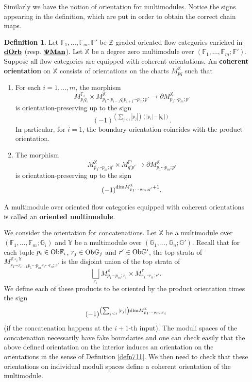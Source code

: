 \documentclass[reqno, 10pt]{amsart}
\numberwithin{equation}{section}
\numberwithin{equation}{section}
\theoremstyle{definition}
\newtheorem{defn}[thm]{Definition}
\theoremstyle{remark}
\newcommand{\beqn}{\begin{equation*}}
\newcommand{\eeqn}{\end{equation*}}
\newcommand{\mb}{\mathbb}
\newcommand{\pman}{\uds{{\bf \Psi}{\bf Man}}}
\newcommand{\uds}[1]{\underline{\smash{#1}}}
\begin{document}
Similarly we have the notion of orientation for multimodules. Notice the signs appearing in the definition, which are put in order to obtain the correct chain maps.


\begin{defn}\label{defn_orientation_multimodule}
Let ${\mb F}_1, \ldots, {\mb F}_m, {\mb F}'$ be ${\mb Z}$-graded oriented flow categories enriched in $\uds{\bf dOrb}$ (resp. $\pman$). Let ${\mb X}$ be a degree zero multimodule over $({\mb F}_1, \ldots, {\mb F}_m; {\mb F}')$. Suppose all flow categories are equipped with coherent orientations. An {\bf coherent orientation} on ${\mb X}$ consists of orientations on the charts $M_{pq}^{{\mb X}}$ such that \begin{enumerate}

\item For each $i = 1, \ldots, m$, the morphism 
\beqn
M_{p_i q_i}^{{\mb F}_i} \times M_{p_1 \cdots p_{i-1} q_i p_{i+1}\cdots p_m; p'}^{{\mb X}} \to \partial M_{p_1 \cdots p_m; p'}^{{\mb X}}
\eeqn
is orientation-preserving up to the sign 
\beqn
(-1)^{ (\sum_{j<i} |p_j |) (|p_i| - |q_i|)}.
\eeqn
In particular, for $i=1$, the boundary orientation coincides with the product orientation.

\item The morphism 
\beqn
M_{p_1 \cdots p_m; q'}^{\mb X} \times M_{q' p'}^{{\mb F}'} \to \partial M_{p_1 \cdots p_m; p'}^{{\mb X}}
\eeqn
is orientation-preserving up to the sign
\beqn
(-1)^{{\rm dim} M_{p_1 \cdots p_m; q'}^{\mb X} + 1}.
\eeqn
 
\end{enumerate}

A multimodule over oriented flow categories equipped with coherent orientations is called an {\bf oriented multimodule}.
\end{defn}




We consider the orientation for concatenations. Let ${\mb X}$ be a multimodule over $({\mb F}_1, \ldots, {\mb F}_m; {\mb G}_i)$ and ${\mb Y}$ be a multimodule over $({\mb G}_1, \ldots, {\mb G}_n; {\mb G}')$. Recall that for each tuple $p_i \in {\rm Ob}{\mb F}_i$, $r_j \in {\rm Ob}{\mb G}_j$ and $r' \in {\rm Ob}{\mb G}'$, the top strata of $M_{r_1 \cdots r_{i-1} p_1 \cdots p_m  r_i \cdots r_n; r'}^{{\mb X} \circ_i {\mb Y}}$ is the disjoint union of the top strata of 
\beqn
\bigsqcup_{r_i} M_{p_1 \cdots p_m; r_i}^{\mb X} \times M_{r_1 \cdots r_n; r'}^{\mb Y}.
\eeqn
We define each of these products to be oriented by the product orientation times the sign
\beqn
(-1)^{\left( \sum_{j<i} |r_j|\right){\rm dim} M_{p_1 \cdots p_m; r_i}^{\mb X}} 
\eeqn
(if the concatenation happens at the $i+1$-th input). The moduli spaces of the concatenation necessarily have fake boundaries and one can check easily that the above defined orientation on the interior induces an orientation on the orientations in the sense of Definition \ref{defn711}. We then need to check that these orientations on individual moduli spaces define a coherent orientation of the multimodule.
\end{document}

